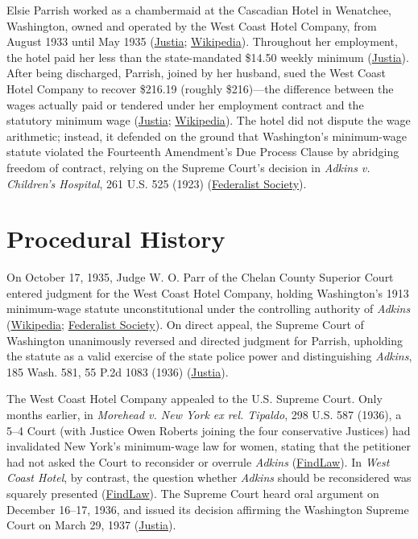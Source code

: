 \documentclass[12pt]{article}
\begin{document}
Elsie Parrish worked as a chambermaid at the Cascadian Hotel in Wenatchee, Washington, owned and operated by the West Coast Hotel Company, from August 1933 until May 1935 (\href{https://supreme.justia.com/cases/federal/us/300/379/}{Justia}; \href{https://en.wikipedia.org/wiki/West_Coast_Hotel_Co._v._Parrish}{Wikipedia}). Throughout her employment, the hotel paid her less than the state-mandated \$14.50 weekly minimum (\href{https://supreme.justia.com/cases/federal/us/300/379/}{Justia}). After being discharged, Parrish, joined by her husband, sued the West Coast Hotel Company to recover \$216.19 (roughly \$216)---the difference between the wages actually paid or tendered under her employment contract and the statutory minimum wage (\href{https://supreme.justia.com/cases/federal/us/300/379/}{Justia}; \href{https://en.wikipedia.org/wiki/West_Coast_Hotel_Co._v._Parrish}{Wikipedia}). The hotel did not dispute the wage arithmetic; instead, it defended on the ground that Washington's minimum-wage statute violated the Fourteenth Amendment's Due Process Clause by abridging freedom of contract, relying on the Supreme Court's decision in \textit{Adkins v. Children's Hospital}, 261 U.S. 525 (1923) (\href{https://fedsoc.org/case/west-coast-hotel-company-v-parrish}{Federalist Society}).

\section{Procedural History}

On October 17, 1935, Judge W. O. Parr of the Chelan County Superior Court entered judgment for the West Coast Hotel Company, holding Washington's 1913 minimum-wage statute unconstitutional under the controlling authority of \textit{Adkins} (\href{https://en.wikipedia.org/wiki/West_Coast_Hotel_Co._v._Parrish}{Wikipedia}; \href{https://fedsoc.org/case/west-coast-hotel-company-v-parrish}{Federalist Society}). On direct appeal, the Supreme Court of Washington unanimously reversed and directed judgment for Parrish, upholding the statute as a valid exercise of the state police power and distinguishing \textit{Adkins}, 185 Wash. 581, 55 P.2d 1083 (1936) (\href{https://supreme.justia.com/cases/federal/us/300/379/}{Justia}).

The West Coast Hotel Company appealed to the U.S. Supreme Court. Only months earlier, in \textit{Morehead v. New York ex rel. Tipaldo}, 298 U.S. 587 (1936), a 5--4 Court (with Justice Owen Roberts joining the four conservative Justices) had invalidated New York's minimum-wage law for women, stating that the petitioner had not asked the Court to reconsider or overrule \textit{Adkins} (\href{https://caselaw.findlaw.com/court/us-supreme-court/300/379.html}{FindLaw}). In \textit{West Coast Hotel}, by contrast, the question whether \textit{Adkins} should be reconsidered was squarely presented (\href{https://caselaw.findlaw.com/court/us-supreme-court/300/379.html}{FindLaw}). The Supreme Court heard oral argument on December 16--17, 1936, and issued its decision affirming the Washington Supreme Court on March 29, 1937 (\href{https://supreme.justia.com/cases/federal/us/300/379/}{Justia}).
\end{document}
